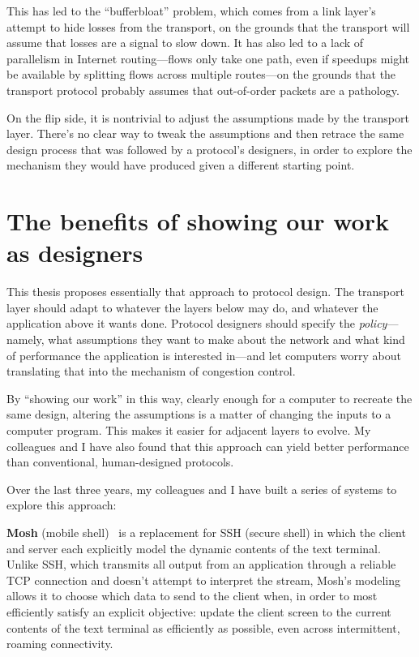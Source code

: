 This has led to the ``bufferbloat''\cite{bufferbloat} problem, which
comes from a link layer's attempt to hide losses from the transport,
on the grounds that the transport will assume that losses are a signal
to slow down. It has also led to a lack of parallelism in Internet
routing---flows only take one path, even if speedups might be
available by splitting flows across multiple routes---on the grounds
that the transport protocol probably assumes that out-of-order packets
are a pathology.

On the flip side, it is nontrivial to adjust the assumptions made by
the transport layer. There's no clear way to tweak the assumptions and
then retrace the same design process that was followed by a protocol's
designers, in order to explore the mechanism they would have produced
given a different starting point.

\section{The benefits of showing our work as designers}

This thesis proposes essentially that approach to protocol design. The
transport layer should adapt to whatever the layers below may do, and
whatever the application above it wants done. Protocol designers
should specify the \emph{policy}---namely, what assumptions they want
to make about the network and what kind of performance the application
is interested in---and let computers worry about translating that into
the mechanism of congestion control.

By ``showing our work'' in this way, clearly enough for a computer to
recreate the same design, altering the assumptions is a matter of
changing the inputs to a computer program. This makes it easier for
adjacent layers to evolve. My colleagues and I have also found that
this approach can yield better performance than conventional,
human-designed protocols.

Over the last three years, my colleagues and I have built a series of
systems to explore this approach:

\textbf{Mosh} (mobile shell)~\cite{mosh} is a replacement for SSH
(secure shell) in which the client and server each explicitly model
the dynamic contents of the text terminal. Unlike SSH, which transmits all
output from an application through a reliable TCP connection and
doesn't attempt to interpret the stream, Mosh's modeling allows it
to choose which data to send to the client when, in order to most
efficiently satisfy an explicit objective: update the client screen to
the current contents of the text terminal as efficiently as possible,
even across intermittent, roaming connectivity.

